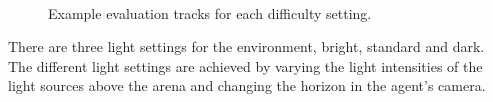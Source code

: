 \begin{figure}
    \centering
    \qquad
    \qquad
    \\
    \caption{Example evaluation tracks for each difficulty setting.}
    \label{fig:track_difficulty_settings}
\end{figure}


There are three light settings for the environment, bright, standard and dark. The different light settings are achieved by varying the light intensities of the light sources above the arena and changing the horizon in the agent's camera.

